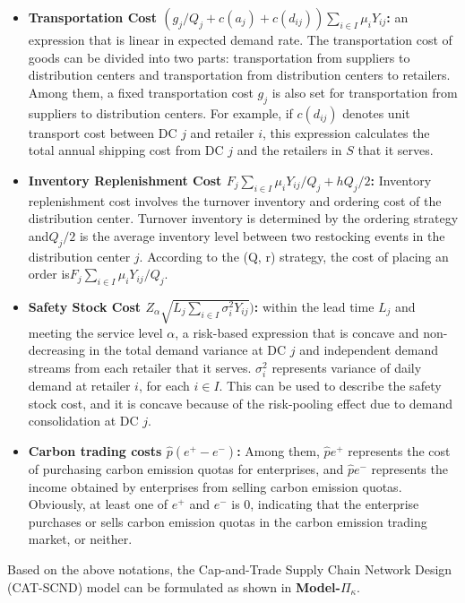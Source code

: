 \documentclass[]{article}
\theoremstyle{plain}%
\theoremstyle{definition}
\theoremstyle{remark}
\theoremstyle{plain}%
\begin{document}
\begin{itemize}
\noindent\item\textbf{Transportation Cost $({g_j}/{Q_j}+c(a_j)+c(d_{ij}))\sum_{i\in I}\mu_iY_{ij}$:} an expression that is linear in expected demand rate. The transportation cost of goods can be divided into two parts: transportation from suppliers to distribution centers and transportation from distribution centers to retailers. Among them, a fixed transportation cost $g_j$ is also set for transportation from suppliers to distribution centers. For example, if $c(d_{ij})$ denotes unit transport cost between DC $j$ and retailer $i$, this expression calculates the total annual shipping cost from DC $j$ and the retailers in $S$ that it serves.
    
\noindent\item\textbf{Inventory Replenishment Cost ${F_j\sum_{i\in I}\mu_iY_{ij}}/{Q_j}+{hQ_j}/{2}$:} Inventory replenishment cost involves the turnover inventory and ordering cost of the distribution center. Turnover inventory is determined by the ordering strategy and${Q_j}/{2}$ is the average inventory level between two restocking events in the distribution center $j$. According to the (Q, r) strategy, the cost of placing an order is${F_j\sum_{i\in I}\mu_iY_{ij}}/{Q_j}$.
    
\noindent\item\textbf{Safety Stock Cost $Z_{\alpha}\sqrt{L_j\sum_{i\in I}\sigma_i^2Y_{ij}})$:} within the lead time $L_j$ and meeting the service level $\alpha$, a risk-based expression that is concave and non-decreasing in the total demand variance at DC $j$ and independent demand streams from each retailer that it serves. $\sigma^2_i$ represents variance of daily demand at retailer $i$, for each $i\in I $. This can be used to describe the safety stock cost, and it is concave because of the risk-pooling effect due to demand consolidation at DC $j$. 

\noindent\item\textbf{Carbon trading costs $\hat{p}(e^+-e^-)$:} Among them, $\hat{p}e^+$ represents the cost of purchasing carbon emission quotas for enterprises, and $\hat{p}e^-$ represents the income obtained by enterprises from selling carbon emission quotas. Obviously, at least one of $e^+$ and $e^-$ is 0, indicating that the enterprise purchases or sells carbon emission quotas in the carbon emission trading market, or neither.
    \end{itemize}
    
    
    Based on the above notations, the Cap-and-Trade Supply Chain Network Design (CAT-SCND) model can be formulated as shown in \textbf{Model-}$\Pi_\kappa$.
    
\end{document}

